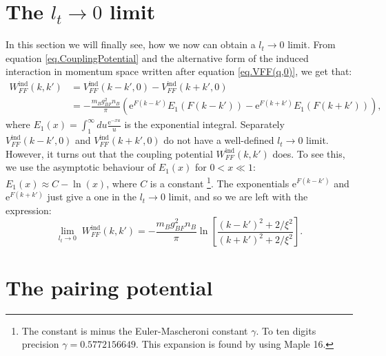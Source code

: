 \section{The $l_t \to 0$ limit}
In this section we will finally see, how we now can obtain a $l_t\to 0$ limit. From equation \eqref{eq.CouplingPotential} and the alternative form of the induced interaction in momentum space written after equation \eqref{eq.VFF(q,0)}, we get that:
\begin{align}
W^\text{ind}_{FF}(k,k') &= V^\text{ind}_{FF}(k-k',0) - V^\text{ind}_{FF}(k+k',0) \nonumber \\
&= -\frac{m_Bg_{BF}^2n_B}{\pi}\left( \text{e}^{F(k-k')} E_1(F(k-k')) - \text{e}^{F(k+k')} E_1(F(k+k')) \right), \nonumber
\end{align}
where $E_1(x) = \int_1^\infty du \frac{\text{e}^{-xu}}{u}$ is the exponential integral. Separately $V^\text{ind}_{FF}(k-k',0)$ and $V^\text{ind}_{FF}(k+k',0)$ do not have a well-defined $l_t \to 0$ limit. However, it turns out that the coupling potential $W^\text{ind}_{FF}(k,k')$ does. To see this, we use the asymptotic behaviour of $E_1(x)$ for $0 < x \ll 1$: $E_1(x) \approx C -\ln(x)$, where $C$ is a constant \footnote{The constant is minus the Euler-Mascheroni constant $\gamma$. To ten digits precision $\gamma = 0.5772156649$. This expansion is found by using Maple 16.}. The exponentials $\text{e}^{F(k-k')}$ and $\text{e}^{F(k+k')}$ just give a one in the $l_t \to 0$ limit, and so we are left with the expression:
\begin{equation}
\lim_{l_t \to 0} \; W^\text{ind}_{FF}(k,k') = -\frac{m_Bg_{BF}^2n_B}{\pi} \ln\left[\frac{(k-k')^2+2/\xi^2}{(k+k')^2+2/\xi^2}\right].
\label{eq.CouplingPotentiallt=0} 
\end{equation}

\section{The pairing potential} \label{sec.pairingpotential}

